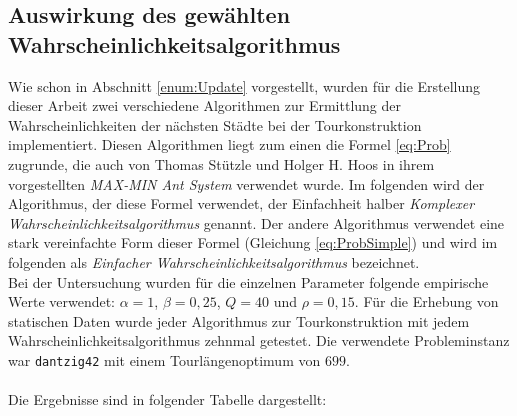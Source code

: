 \documentclass[doktyp=barbeit, sprache=german]{TUBAFarbeiten}
\begin{document}
\subsection{Auswirkung des gewählten Wahrscheinlichkeitsalgorithmus}
\label{AuswirkungWA}
Wie schon in Abschnitt \ref{enum:Update} vorgestellt, wurden für die Erstellung dieser Arbeit zwei verschiedene Algorithmen zur Ermittlung der Wahrscheinlichkeiten der nächsten Städte bei der Tourkonstruktion implementiert. Diesen Algorithmen liegt zum einen die Formel \ref{eq:Prob} zugrunde, die auch von Thomas Stützle und Holger H. Hoos in ihrem vorgestellten \textit{MAX-MIN Ant System} verwendet wurde. Im folgenden wird der Algorithmus, der diese Formel verwendet, der Einfachheit halber \textit{Komplexer Wahrscheinlichkeitsalgorithmus} genannt. Der andere Algorithmus verwendet eine stark vereinfachte Form dieser Formel (Gleichung \ref{eq:ProbSimple}) und wird im folgenden als \textit{Einfacher Wahrscheinlichkeitsalgorithmus} bezeichnet.
\\Bei der Untersuchung wurden für die einzelnen Parameter folgende empirische Werte verwendet: $\alpha = 1$, $\beta = 0,25$, $Q = 40$ und $\rho = 0,15$. Für die Erhebung von statischen Daten wurde jeder Algorithmus zur Tourkonstruktion mit jedem Wahrscheinlichkeitsalgorithmus zehnmal getestet. Die verwendete Probleminstanz war \texttt{dantzig42} mit einem Tourlängenoptimum von $699$.
\\\\Die Ergebnisse sind in folgender Tabelle dargestellt:
\begin{table}[]
\captionsetup{justification=centering}
\centering
{}
\caption{Ergebnisse für die einzelnen in Algorithmen in Abhängigkeit von dem gewählten Wahrscheinlichkeitsalgorithmus. Die Prozentzahl hinter der Tourlänge zeigt die Abweichung vom Tourlängenoptimum $d = 699$ an}
\label{table:Prob}
\end{table}
\end{document}
